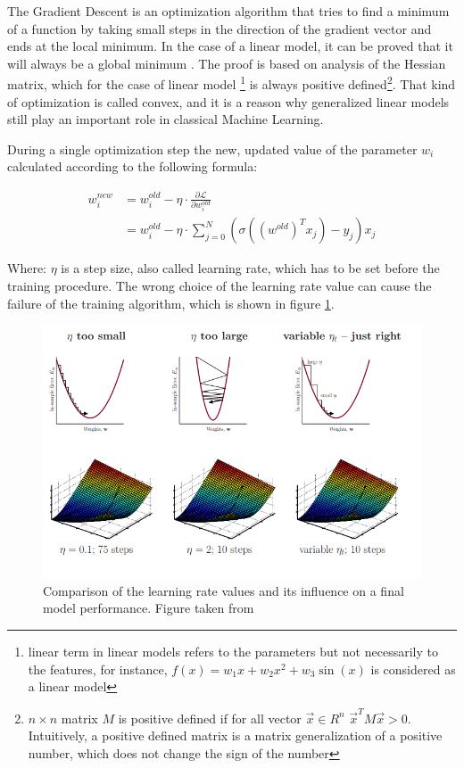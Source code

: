 The Gradient Descent is an optimization algorithm that tries to find a minimum of a function by taking small steps in the direction of the gradient vector and ends at the local minimum. In the case of a linear model, it can be proved that it will always be a global minimum \cite{bishop}. The proof is based on analysis of the Hessian matrix, which for the case of linear model \footnote{linear term in linear models refers to the parameters but not necessarily to the features, for instance, $f(x)=w_1x+w_2x^2 + w_3 \sin(x)$ is considered as a linear model} is always positive defined\footnote{$n \times n$ matrix $M$ is positive defined if for all vector $\vec{x} \in R^{n}$ $\vec{x}^{T}M\vec{x} > 0$. Intuitively, a positive defined matrix is a matrix generalization of a positive number, which does not change the sign of the number}. 
That kind of optimization is called convex, and it is a reason why generalized linear models still play an important role in classical Machine Learning.  

During a single optimization step the new, updated value of the parameter $w_i$ calculated according to the following formula: 

\begin{align}
\label{eq:Gradient decent}
    w_{i}^{new} &= w_{i}^{old} - \eta \cdot \frac{\partial \mathcal{L}}{\partial w_{i}^{old}} \nonumber \\
    &= w_{i}^{old} - \eta  \cdot \sum_{j=0}^{N} \left( \sigma((w^{old})^{T}x_{j}) - y_{j} \right) x_j
\end{align}

Where: $\eta$ is a step size, also called learning rate, which has to be set before the training procedure. The wrong choice of the learning rate value can cause the failure of the training algorithm, which is shown in figure \ref{fig:Gradient decent}. 



\begin{figure}[!h]
\centering
\includegraphics{figures/LR_learning_rate.PNG}
\caption{Comparison of the learning rate values and its influence on a final model performance. Figure taken from \cite{abu-musafa}  
\label{fig:Gradient decent}}
\end{figure}


